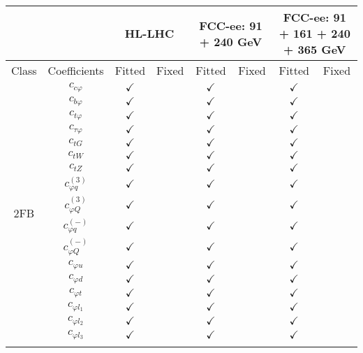 \documentclass{article}
\begin{document}
\begin{table}[H]
\centering
\begin{tabular}{|c|c|c|c|c|c|c|c|}
\hline
 &  & \multicolumn{2}{c|}{HL-LHC} & \multicolumn{2}{c|}{FCC-ee: 91 + 240 GeV} & \multicolumn{2}{c|}{FCC-ee: 91 + 161 + 240 + 365 GeV} \\ \hline
Class & Coefficients & Fitted & Fixed  & Fitted & Fixed  & Fitted & Fixed  \\ \hline
\multirow{23}{*}{2FB}
 & $c_{c \varphi}$ & $\checkmark$ &  & $\checkmark$ &  & $\checkmark$ & \\ \cline{2-8}
 & $c_{b \varphi}$ & $\checkmark$ &  & $\checkmark$ &  & $\checkmark$ & \\ \cline{2-8}
 & $c_{t \varphi}$ & $\checkmark$ &  & $\checkmark$ &  & $\checkmark$ & \\ \cline{2-8}
 & $c_{\tau \varphi}$ & $\checkmark$ &  & $\checkmark$ &  & $\checkmark$ & \\ \cline{2-8}
 & $c_{tG}$ & $\checkmark$ &  & $\checkmark$ &  & $\checkmark$ & \\ \cline{2-8}
 & $c_{tW}$ & $\checkmark$ &  & $\checkmark$ &  & $\checkmark$ & \\ \cline{2-8}
 & $c_{tZ}$ & $\checkmark$ &  & $\checkmark$ &  & $\checkmark$ & \\ \cline{2-8}
 & $c_{\varphi q}^{(3)}$ & $\checkmark$ &  & $\checkmark$ &  & $\checkmark$ & \\ \cline{2-8}
 & $c_{\varphi Q}^{(3)}$ & $\checkmark$ &  & $\checkmark$ &  & $\checkmark$ & \\ \cline{2-8}
 & $c_{\varphi q}^{(-)}$ & $\checkmark$ &  & $\checkmark$ &  & $\checkmark$ & \\ \cline{2-8}
 & $c_{\varphi Q}^{(-)}$ & $\checkmark$ &  & $\checkmark$ &  & $\checkmark$ & \\ \cline{2-8}
 & $c_{\varphi u}$ & $\checkmark$ &  & $\checkmark$ &  & $\checkmark$ & \\ \cline{2-8}
 & $c_{\varphi d}$ & $\checkmark$ &  & $\checkmark$ &  & $\checkmark$ & \\ \cline{2-8}
 & $c_{\varphi t}$ & $\checkmark$ &  & $\checkmark$ &  & $\checkmark$ & \\ \cline{2-8}
 & $c_{\varphi l_1}$ & $\checkmark$ &  & $\checkmark$ &  & $\checkmark$ & \\ \cline{2-8}
 & $c_{\varphi l_2}$ & $\checkmark$ &  & $\checkmark$ &  & $\checkmark$ & \\ \cline{2-8}
 & $c_{\varphi l_3}$ & $\checkmark$ &  & $\checkmark$ &  & $\checkmark$ & \\ \cline{2-8}

\end{tabular}
\end{table}
\end{document}
